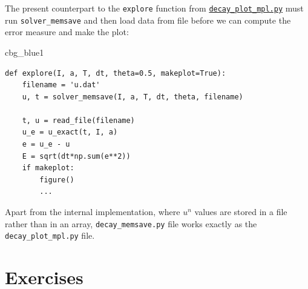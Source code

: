 \documentclass[%
oneside,                 %
final,                   %
10pt]{article}
\newenvironment{_cod_tight}[1]{
   \def\FrameCommand{\colorbox{#1}}
   \FrameRule0.6pt\MakeFramed {\FrameRestore}\vskip3mm}
   {\vskip0mm\endMakeFramed}
\newenvironment{cod}[1]{
\bgroup\rmfamily
\fboxsep=0mm\relax
\begin{_cod_tight}{#1}
\list{}{\parsep=-2mm\parskip=0mm\topsep=0pt\leftmargin=2mm
\rightmargin=2\leftmargin\leftmargin=4pt\relax}
\item\relax}
{\endlist\end{_cod_tight}\egroup}
\begin{document}
The present counterpart to the \texttt{explore} function from
\href{{http://tinyurl.com/ofkw6kc/alg/decay_plot_mpl.py}}{\nolinkurl{decay_plot_mpl.py}} must run
\Verb!solver_memsave! and then load data from file before we can compute
the error measure and make the plot:

\begin{cod}{cbg_blue1}\begin{Verbatim}[numbers=none,fontsize=\fontsize{9pt}{9pt},baselinestretch=0.95,xleftmargin=2mm]
def explore(I, a, T, dt, theta=0.5, makeplot=True):
    filename = 'u.dat'
    u, t = solver_memsave(I, a, T, dt, theta, filename)

    t, u = read_file(filename)
    u_e = u_exact(t, I, a)
    e = u_e - u
    E = sqrt(dt*np.sum(e**2))
    if makeplot:
        figure()
        ...
\end{Verbatim}
\end{cod}
\noindent

Apart from the internal implementation, where $u^n$ values are stored
in a file rather than in an array, \Verb!decay_memsave.py! file works
exactly as the \Verb!decay_plot_mpl.py! file.

\section{Exercises}
\end{document}

